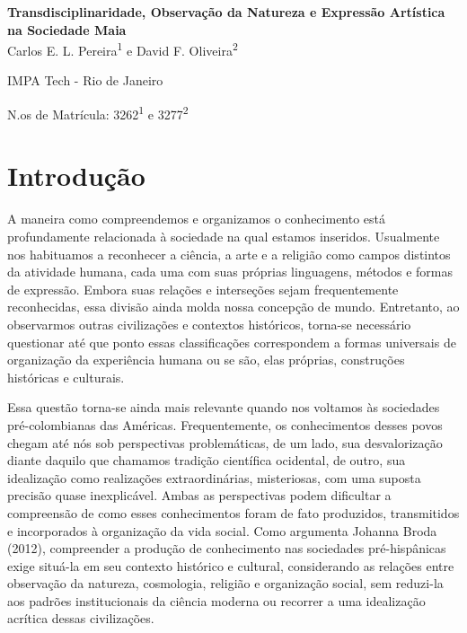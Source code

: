 \documentclass[11pt, a4paper]{article}
\begin{document}
\noindent


\begin{center}
\textbf{ \large {Transdisciplinaridade, Observação da Natureza e
Expressão Artística na Sociedade Maia}}\\
Carlos E. L. Pereira\textsuperscript{1} e David F. Oliveira\textsuperscript{2}

IMPA Tech - Rio de Janeiro

{\small N.os de Matrícula:  3262\textsuperscript{1} e 3277\textsuperscript{2}}
\end{center}

\section{Introdução}


A maneira como compreendemos e organizamos o conhecimento está profundamente relacionada à sociedade na qual estamos inseridos. Usualmente nos habituamos a reconhecer a ciência, a arte e a religião como campos distintos da atividade humana, cada uma com suas próprias linguagens, métodos e formas de expressão. Embora suas relações e interseções sejam frequentemente reconhecidas, essa divisão ainda molda nossa concepção de mundo. Entretanto, ao observarmos outras civilizações e contextos históricos, torna-se necessário questionar até que ponto essas classificações correspondem a formas universais de organização da experiência humana ou se são, elas próprias, construções históricas e culturais.

Essa questão torna-se ainda mais relevante quando nos voltamos às sociedades pré-colombianas das Américas. Frequentemente, os conhecimentos desses povos chegam até nós sob perspectivas problemáticas, de um lado, sua desvalorização diante daquilo que chamamos tradição científica ocidental, de outro, sua idealização como realizações extraordinárias, misteriosas, com uma suposta precisão quase inexplicável. Ambas as perspectivas podem dificultar a compreensão de como esses conhecimentos foram de fato produzidos, transmitidos e incorporados à organização da vida social. Como argumenta Johanna Broda (2012), compreender a produção de conhecimento nas sociedades pré-hispânicas exige situá-la em seu contexto histórico e cultural, considerando as relações entre observação da natureza, cosmologia, religião e organização social, sem reduzi-la aos padrões institucionais da ciência moderna ou recorrer a uma idealização acrítica dessas civilizações.
\end{document}
